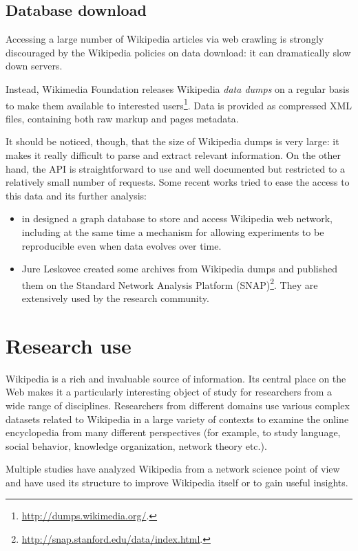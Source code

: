         \subsection{Database download}
            Accessing a large number of Wikipedia articles via web crawling is strongly discouraged by the Wikipedia policies on data download: it can dramatically slow down servers.
            
            Instead, Wikimedia Foundation releases Wikipedia \emph{data dumps} on a regular basis to make them available to interested users\footnote{\url{http://dumps.wikimedia.org/}.}. Data is provided as compressed XML files, containing both raw markup and pages metadata.
            
            It should be noticed, though, that the size of Wikipedia dumps is very large: it makes it really difficult to parse and extract relevant information. On the other hand, the API is straightforward to use and well documented but restricted to a relatively small number of requests. Some recent works tried to ease the access to this data and its further analysis:
            \begin{itemize}
                \item \citeauthor{Aspert} in \cite{Aspert} designed a graph database to store and access Wikipedia web network, including at the same time a mechanism for allowing experiments to be reproducible even when data evolves over time.
                \item Jure Leskovec created some archives from Wikipedia dumps and published them on the Standard Network Analysis Platform (SNAP)\footnote{\url{http://snap.stanford.edu/data/index.html}.}. They are extensively used by the research community. 
            \end{itemize}
    \section{Research use}
        Wikipedia is a rich and invaluable source of information. Its central place on the Web makes it a particularly interesting object of study for researchers from a wide range of disciplines. Researchers from different domains use various complex datasets related to Wikipedia in a large variety of contexts to examine the online encyclopedia from many different perspectives (for example, to study language, social behavior, knowledge organization, network theory etc.).
        
        Multiple studies have analyzed Wikipedia from a network science point of view and have used its structure to improve Wikipedia itself or to gain useful insights.
        
